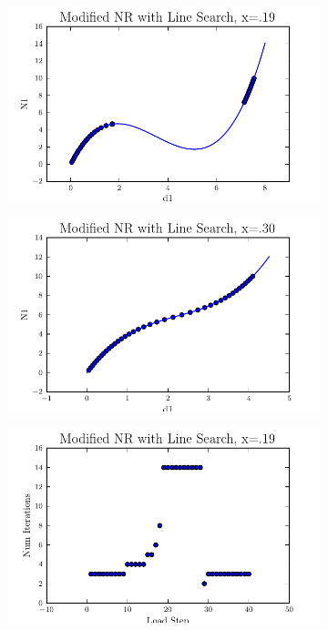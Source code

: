\documentclass[10pt,letterpaper]{article}
\begin{document}
\begin{figure}[!tbh]
  \begin{subfigure}[b]{.6\textwidth}
    \includegraphics[width=\textwidth]{moded_nr_wls_x19.pdf}
    \caption{}
    \label{fig4:label:a}
  \end{subfigure}
  \hfill
  \begin{subfigure}[b]{.6\textwidth}
    \includegraphics[width=\textwidth]{moded_nr_wls_x30.pdf}
    \caption{}
    \label{fig4:label:b}
  \end{subfigure}
  \hfill
    \begin{subfigure}[b]{.6\textwidth}
    \includegraphics[width=\textwidth]{moded_nr_wls_x19_conv.pdf}

\end{subfigure}
\end{figure}
\end{document}
